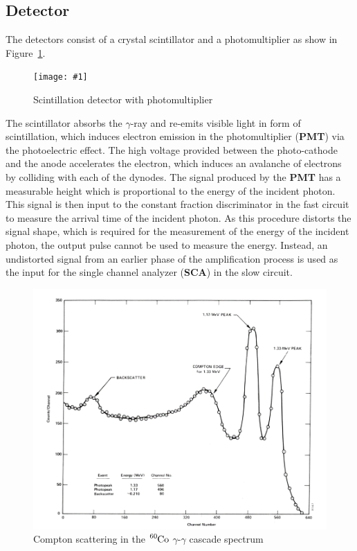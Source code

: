 \documentclass[twocolumn]{article}
\newcommand{\insertFigure}[1]{%
   \texttt{[image: \#1]}%
}
\begin{document}
\subsection{Detector}
The detectors consist of a crystal scintillator and a photomultiplier as show in Figure~\ref{fig:pmt}. \begin{figure}[!h]
	\centering
	\insertFigure{pmt.png}
	\caption{Scintillation detector with photomultiplier \cite{pmt}} 
	\label{fig:pmt}
\end{figure}
The scintillator absorbs the $\gamma$-ray and re-emits visible light in form of scintillation, which induces electron emission in the photomultiplier (\textbf{PMT}) via the photoelectric effect. The high voltage provided between the photo-cathode and the anode accelerates the electron, which induces an avalanche of electrons by colliding with each of the dynodes. The signal produced by the \textbf{PMT} has a measurable height which is proportional to the energy of the incident photon. This signal is then input to the constant fraction discriminator in the fast circuit to measure the arrival time of the incident photon. As this procedure distorts the signal shape, which is required for the measurement of the energy of the incident photon, the output pulse cannot be used to measure the energy. Instead, an undistorted signal from an earlier phase of the amplification process is used as the input for the single channel analyzer (\textbf{SCA}) in the slow circuit.
 \begin{figure}[!h]
 	\centering
 	\includegraphics[width=1\linewidth]{Compt.png}
 	\caption{Compton scattering in the $\ce{^{60}Co}$ $\gamma$-$\gamma$ cascade spectrum \cite{Compt}} 
 	\label{fig:Compt}
 \end{figure}
\end{document}
